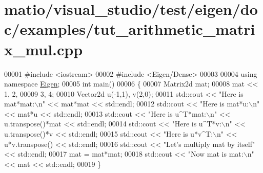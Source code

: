 \hypertarget{matio_2visual__studio_2test_2eigen_2doc_2examples_2tut__arithmetic__matrix__mul_8cpp_source}{}\section{matio/visual\+\_\+studio/test/eigen/doc/examples/tut\+\_\+arithmetic\+\_\+matrix\+\_\+mul.cpp}
\label{matio_2visual__studio_2test_2eigen_2doc_2examples_2tut__arithmetic__matrix__mul_8cpp_source}

\begin{DoxyCode}
00001 \textcolor{preprocessor}{#include <iostream>}
00002 \textcolor{preprocessor}{#include <Eigen/Dense>}
00003 
00004 \textcolor{keyword}{using namespace }\hyperlink{namespace_eigen}{Eigen};
00005 \textcolor{keywordtype}{int} main()
00006 \{
00007   Matrix2d mat;
00008   mat << 1, 2,
00009          3, 4;
00010   Vector2d u(-1,1), v(2,0);
00011   std::cout << \textcolor{stringliteral}{"Here is mat*mat:\(\backslash\)n"} << mat*mat << std::endl;
00012   std::cout << \textcolor{stringliteral}{"Here is mat*u:\(\backslash\)n"} << mat*u << std::endl;
00013   std::cout << \textcolor{stringliteral}{"Here is u^T*mat:\(\backslash\)n"} << u.transpose()*mat << std::endl;
00014   std::cout << \textcolor{stringliteral}{"Here is u^T*v:\(\backslash\)n"} << u.transpose()*v << std::endl;
00015   std::cout << \textcolor{stringliteral}{"Here is u*v^T:\(\backslash\)n"} << u*v.transpose() << std::endl;
00016   std::cout << \textcolor{stringliteral}{"Let's multiply mat by itself"} << std::endl;
00017   mat = mat*mat;
00018   std::cout << \textcolor{stringliteral}{"Now mat is mat:\(\backslash\)n"} << mat << std::endl;
00019 \}
\end{DoxyCode}
